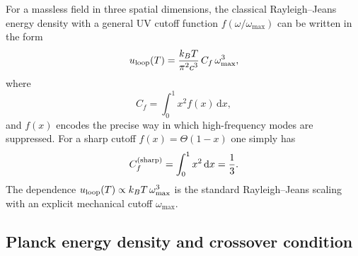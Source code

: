 \documentclass[11pt]{article}
\begin{document}
            For a massless field in three spatial dimensions, the classical
            Rayleigh--Jeans energy density with a general UV cutoff function
            $f(\omega/\omega_{\max})$ can be written in the form
            \begin{equation}
                u_{\rm loop}(T)
                = \frac{k_B T}{\pi^2 c^3}\,C_f\,\omega_{\max}^3,
            \end{equation}
            where
            \begin{equation}
                C_f
                = \int_0^1 x^2 f(x)\,\mathrm{d}x,
            \end{equation}
            and $f(x)$ encodes the precise way in which high-frequency modes are
            suppressed.  For a sharp cutoff $f(x) = \Theta(1-x)$ one simply has
            \begin{equation}
                C_f^{({\rm sharp})}
                = \int_0^1 x^2\,\mathrm{d}x
                = \frac{1}{3}.
            \end{equation}
            The dependence $u_{\rm loop}(T)\propto k_B T\,\omega_{\max}^3$ is the
            standard Rayleigh--Jeans scaling with an explicit mechanical cutoff
            $\omega_{\max}$.

        \subsection{Planck energy density and crossover condition}
\end{document}
